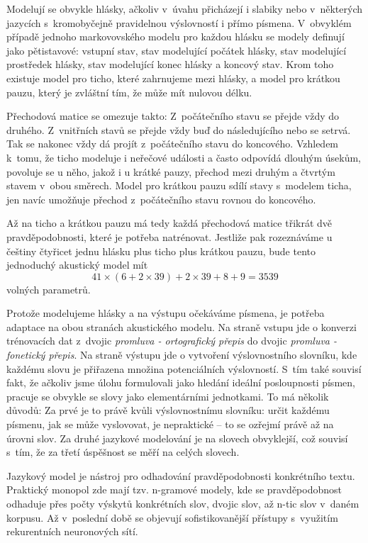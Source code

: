 Modelují se obvykle hlásky, ačkoliv v~úvahu přicházejí i slabiky nebo
v~některých jazycích s~kromobyčejně pravidelnou výslovností i přímo písmena.
V~obvyklém případě jednoho markovovského modelu pro každou hlásku se modely
definují jako pětistavové: vstupní stav, stav modelující počátek hlásky, stav
modelující prostředek hlásky, stav modelující konec hlásky a koncový stav. Krom
toho existuje model pro ticho, které zahrnujeme mezi hlásky, a model pro krátkou
pauzu, který je zvláštní tím, že může mít nulovou délku.

Přechodová matice se omezuje takto: Z~počátečního stavu se přejde vždy do
druhého. Z~vnitřních stavů se přejde vždy buď do následujícího nebo se setrvá.
Tak se nakonec vždy dá projít z~počátečního stavu do koncového.
Vzhledem k~tomu, že ticho modeluje i neřečové události a často odpovídá dlouhým
úsekům, povoluje se u něho, jakož i u krátké pauzy, přechod mezi druhým a
čtvrtým stavem v~obou směrech. Model pro krátkou pauzu sdílí stavy s~modelem
ticha, jen navíc umožňuje přechod z~počátečního stavu rovnou do koncového.

Až na ticho a krátkou pauzu má tedy každá přechodová matice třikrát dvě
pravděpodobnosti, které je potřeba natrénovat.
Jestliže pak rozeznáváme u češtiny čtyřicet jednu hlásku plus ticho plus
krátkou pauzu, bude tento jednoduchý akustický model mít
\begin{equation}
41 \times (6 + 2 \times 39) + 2 \times 39 + 8 + 9 = 3539
\end{equation}
volných parametrů.

Protože modelujeme hlásky a na výstupu očekáváme písmena, je potřeba adaptace na
obou stranách akustického modelu. Na straně vstupu jde o konverzi trénovacích
dat z~dvojic {\em promluva - ortografický přepis} do dvojic {\em promluva -
fonetický přepis}. Na straně výstupu jde o vytvoření výslovnostního slovníku,
kde každému slovu je přiřazena množina potenciálních výslovností. S~tím také
souvisí fakt, že ačkoliv jsme úlohu formulovali jako hledání ideální
posloupnosti písmen, pracuje se obvykle se slovy jako elementárními jednotkami.
To má několik důvodů: Za prvé je to právě kvůli výslovnostnímu slovníku: určit
každému písmenu, jak se může vyslovovat, je nepraktické -- to se ozřejmí právě
až na úrovni slov. Za druhé jazykové modelování je na slovech obvyklejší, což
souvisí s~tím, že za třetí úspěšnost se měří na celých slovech.

Jazykový model je nástroj pro odhadování pravděpodobnosti konkrétního textu.
Praktický monopol zde mají tzv. n-gramové modely, kde se pravděpodobnost
odhaduje přes počty výskytů konkrétních slov, dvojic slov, až n-tic slov v~daném
korpusu. Až v~poslední době se objevují sofistikovanější přístupy s~využitím
rekurentních neuronových sítí.


